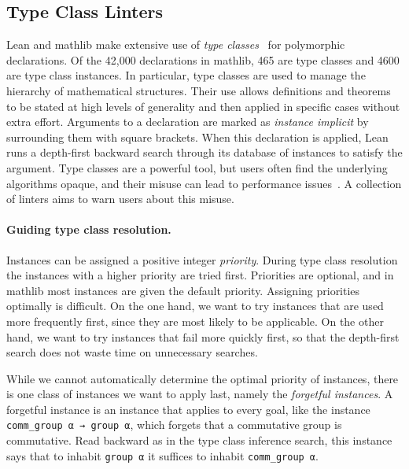 \documentclass[runningheads]{llncs}
\newcommand{\mathlib}{\textsf{mathlib}\xspace}
\begin{document}
\subsection{Type Class Linters}
\label{subsection:typeclass}

Lean and \mathlib make extensive use of \emph{type classes}~\cite{Wadl89}
for polymorphic declarations.
Of the 42,000 declarations in \mathlib,
465 are type classes and 4600 are type class instances.
In particular, type classes are used to manage the hierarchy of mathematical structures.
Their use allows definitions and theorems to be stated at high levels of generality
and then applied in specific cases without extra effort.
Arguments to a declaration are marked as \emph{instance implicit}
by surrounding them with square brackets.
When this declaration is applied,
Lean runs a depth-first backward search through its database of instances
to satisfy the argument.
Type classes are a powerful tool,
but users often find the underlying algorithms opaque,
and their misuse can lead to performance issues~\cite{Sels20}.
A collection of linters
aims to warn users about this misuse.

\paragraph{Guiding type class resolution.}

Instances can be assigned a positive integer \emph{priority}.
During type class resolution the instances with a higher priority are tried first.
Priorities are optional,
and in \mathlib most instances are given the default priority.
Assigning priorities optimally is difficult.
On the one hand, we want to try instances that are used more frequently first,
since they are most likely to be applicable.
On the other hand, we want to try instances that fail more quickly first,
so that the depth-first search does not waste time on unnecessary searches.

While we cannot automatically determine the optimal priority of instances,
there is one class of instances we want to apply last,
namely the \emph{forgetful instances}.
A forgetful instance is an instance that applies to every goal,
like the instance \lstinline{comm_group α → group α},
which forgets that a commutative group is commutative.
Read backward as in the type class inference search,
this instance says that to inhabit \lstinline{group α}
it suffices to inhabit \lstinline{comm_group α}.
\end{document}
